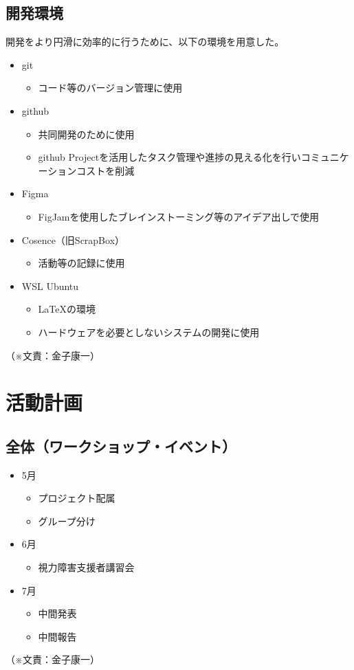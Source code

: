\documentclass[12pt,a4paper]{report}
\newcommand{\Writer}[1]{
  \normalsize
  \begin{flushright}
    （※文責：#1）
  \end{flushright}
}
\begin{document}
\subsection{開発環境}
\noindent\space
開発をより円滑に効率的に行うために、以下の環境を用意した。
\begin{itemize}
  \item git
  \begin{itemize}
    \item コード等のバージョン管理に使用  
  \end{itemize}
  \item github
  \begin{itemize}
    \item 共同開発のために使用
    \item github Projectを活用したタスク管理や進捗の見える化を行いコミュニケーションコストを削減
  \end{itemize}
  \item Figma
  \begin{itemize}
    \item FigJamを使用したブレインストーミング等のアイデア出しで使用  
  \end{itemize}
  \item Cosence（旧ScrapBox）
  \begin{itemize}
    \item 活動等の記録に使用  
  \end{itemize}
  \item WSL Ubuntu
  \begin{itemize}
    \item LaTeXの環境
    \item ハードウェアを必要としないシステムの開発に使用  
  \end{itemize}
\end{itemize}
\Writer{金子康一}

\section{活動計画}\noindent
\subsection{全体（ワークショップ・イベント）}
\noindent\space
\begin{itemize}
  \item 5月
  \begin{itemize}
    \item プロジェクト配属
    \item グループ分け
  \end{itemize}
  \item 6月
  \begin{itemize}
    \item 視力障害支援者講習会
  \end{itemize}
  \item 7月
  \begin{itemize}
    \item 中間発表
    \item 中間報告
  \end{itemize}
\end{itemize}
\Writer{金子康一}
\end{document}
